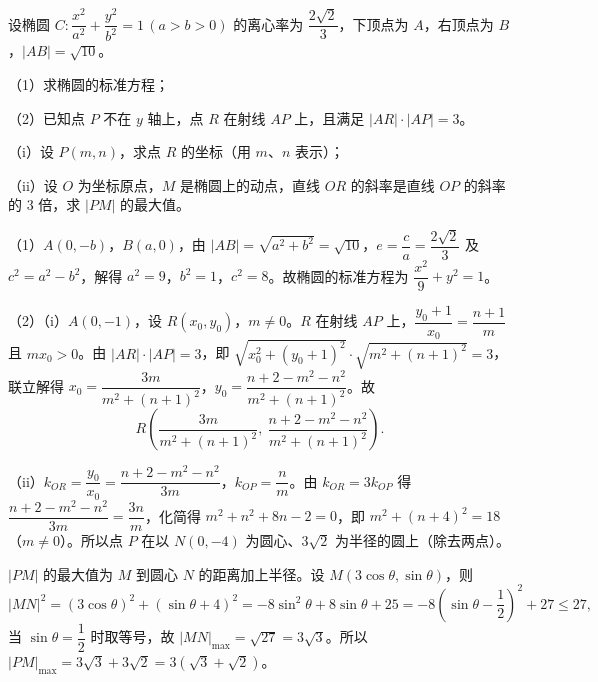 \documentclass{exam-zh}
\begin{document}
\begin{problem}[points = 17]
设椭圆 $C\colon \dfrac{x^{2}}{a^{2}}+\dfrac{y^{2}}{b^{2}}=1\,(a>b>0)$ 的离心率为 $\dfrac{2\sqrt{2}}{3}$，下顶点为 $A$，右顶点为 $B$，$|AB|=\sqrt{10}$。

（1）求椭圆的标准方程；

（2）已知点 $P$ 不在 $y$ 轴上，点 $R$ 在射线 $AP$ 上，且满足 $|AR|\cdot|AP|=3$。

\qquad（i）设 $P(m,n)$，求点 $R$ 的坐标（用 $m$、$n$ 表示）；

\qquad（ii）设 $O$ 为坐标原点，$M$ 是椭圆上的动点，直线 $OR$ 的斜率是直线 $OP$ 的斜率的 $3$ 倍，求 $|PM|$ 的最大值。

\begin{solution}
（1）$A(0,-b)$，$B(a,0)$，由 $|AB|=\sqrt{a^{2}+b^{2}}=\sqrt{10}$，$e=\dfrac{c}{a}=\dfrac{2\sqrt{2}}{3}$ 及 $c^{2}=a^{2}-b^{2}$，解得 $a^{2}=9$，$b^{2}=1$，$c^{2}=8$。故椭圆的标准方程为 $\dfrac{x^{2}}{9}+y^{2}=1$。

（2）（i）$A(0,-1)$，设 $R(x_{0},y_{0})$，$m\ne 0$。$R$ 在射线 $AP$ 上，$\dfrac{y_{0}+1}{x_{0}}=\dfrac{n+1}{m}$ 且 $mx_{0}>0$。由 $|AR|\cdot|AP|=3$，即 $\sqrt{x_{0}^{2}+(y_{0}+1)^{2}}\cdot\sqrt{m^{2}+(n+1)^{2}}=3$，联立解得 $x_{0}=\dfrac{3m}{m^{2}+(n+1)^{2}}$，$y_{0}=\dfrac{n+2-m^{2}-n^{2}}{m^{2}+(n+1)^{2}}$。故
\[R\left(\frac{3m}{m^{2}+(n+1)^{2}},\ \frac{n+2-m^{2}-n^{2}}{m^{2}+(n+1)^{2}}\right).\]

（ii）$k_{OR}=\dfrac{y_{0}}{x_{0}}=\dfrac{n+2-m^{2}-n^{2}}{3m}$，$k_{OP}=\dfrac{n}{m}$。由 $k_{OR}=3k_{OP}$ 得 $\dfrac{n+2-m^{2}-n^{2}}{3m}=\dfrac{3n}{m}$，化简得 $m^{2}+n^{2}+8n-2=0$，即 $m^{2}+(n+4)^{2}=18$（$m\ne 0$）。所以点 $P$ 在以 $N(0,-4)$ 为圆心、$3\sqrt{2}$ 为半径的圆上（除去两点）。

$|PM|$ 的最大值为 $M$ 到圆心 $N$ 的距离加上半径。设 $M(3\cos\theta,\sin\theta)$，则
\[|MN|^{2}=(3\cos\theta)^{2}+(\sin\theta+4)^{2}=-8\sin^{2}\theta+8\sin\theta+25=-8\left(\sin\theta-\dfrac12\right)^{2}+27\le 27,\]
当 $\sin\theta=\dfrac12$ 时取等号，故 $|MN|_{\max}=\sqrt{27}=3\sqrt{3}$。所以 $|PM|_{\max}=3\sqrt{3}+3\sqrt{2}=3(\sqrt{3}+\sqrt{2})$。
\end{solution}
\end{problem}
\end{document}
